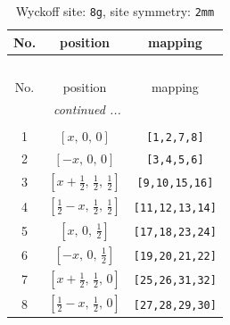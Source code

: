 \documentclass[fleqn,8pt]{jsarticle}
\begin{document}
\begin{longtable}{ccc}
\caption{Wyckoff site: {\tt 8g}, site symmetry: {\tt 2mm}}
 \\
 \hline \hline
No. & position & mapping \\ \hline \endfirsthead

\multicolumn{2}{l}{\tablename\ \thetable{}} \\
 \hline \hline
No. & position & mapping \\ \hline \endhead

 \hline \hline
\multicolumn{2}{r}{\footnotesize\it continued ...} \\ \endfoot

 \hline \hline
\multicolumn{2}{r}{} \\ \endlastfoot

1 & $\left[ x,\, 0,\, 0 \right]$ & {\tt [1,2,7,8]} \\ \hline
2 & $\left[ - x,\, 0,\, 0 \right]$ & {\tt [3,4,5,6]} \\ \hline
3 & $\left[ x + \frac{1}{2},\, \frac{1}{2},\, \frac{1}{2} \right]$ & {\tt [9,10,15,16]} \\ \hline
4 & $\left[ \frac{1}{2} - x,\, \frac{1}{2},\, \frac{1}{2} \right]$ & {\tt [11,12,13,14]} \\ \hline
5 & $\left[ x,\, 0,\, \frac{1}{2} \right]$ & {\tt [17,18,23,24]} \\ \hline
6 & $\left[ - x,\, 0,\, \frac{1}{2} \right]$ & {\tt [19,20,21,22]} \\ \hline
7 & $\left[ x + \frac{1}{2},\, \frac{1}{2},\, 0 \right]$ & {\tt [25,26,31,32]} \\ \hline
8 & $\left[ \frac{1}{2} - x,\, \frac{1}{2},\, 0 \right]$ & {\tt [27,28,29,30]} \\
\end{longtable}
\renewcommand{\arraystretch}{1.2}
\end{document}
